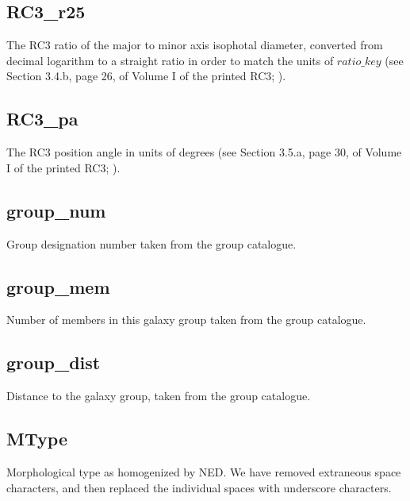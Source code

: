 \subsection{RC3\_r25} \label{RC3_r25}
The RC3 ratio of the major to minor axis isophotal diameter, converted from decimal logarithm to a straight ratio in order to match the units of $ratio\_key$ (see Section 3.4.b, page 26, of Volume I of the printed RC3; \citealt{RC3}).

\subsection{RC3\_pa} \label{RC3_pa}
The RC3 position angle in units of degrees (see Section 3.5.a, page 30, of Volume I of the printed RC3; \citealt{RC3}).

\subsection{group\_num} \label{group_num}
Group designation number taken from the \cite{tully2015} group catalogue.

\subsection{group\_mem} \label{group_mem}
Number of members in this galaxy group taken from the \cite{tully2015} group catalogue.

\subsection{group\_dist} \label{group_dist}
Distance to the galaxy group, taken from the \cite{tully2015} group catalogue.

\subsection{MType} \label{MType}
Morphological type as homogenized by NED. We have removed extraneous space characters, and then replaced the individual spaces with underscore characters.

